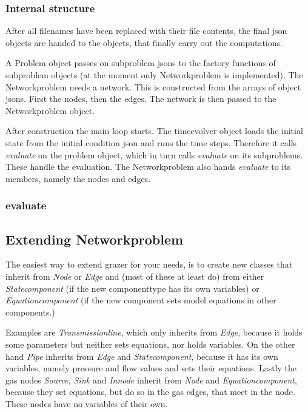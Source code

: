\documentclass[a4paper]{article}
\begin{document}
\subsubsection{Internal structure}
\label{sec:internal-structure}
After all filenames have been replaced with their file contents, the final json objects are handed to the objects, that finally carry out the computations.

A Problem object passes on subproblem jsons to the factory functions of subproblem objects (at the moment only Networkproblem is implemented).
The Networkproblem needs a network.
This is constructed from the arrays of object jsons. First the nodes, then the edges. The network is then passed to the Networkproblem object.


After construction the main loop starts.
The timeevolver object loads the initial state from the initial condition json and runs the time steps.
Therefore it calls \emph{evaluate} on the problem object, which in turn calls \emph{evaluate} on its subproblems.
These handle the evaluation. The Networkproblem also hands \emph{evaluate} to its members, namely the nodes and edges.

\subsubsection*{evaluate}

\subsection{Extending Networkproblem}
\label{sec:extend-netw}
The easiest way to extend grazer for your needs, is to create new classes that inherit from \emph{Node} or \emph{Edge} and
(most of these at least do) from either \emph{Statecomponent} (if the new componenttype has its own variables) or
\emph{Equationcomponent} (if the new component sets model equations in other components.)

Examples are \emph{Transmissionline}, which only inherits from \emph{Edge}, because it holds some parameters but neither sets equations, nor holds variables.
On the other hand \emph{Pipe} inherits from \emph{Edge} and \emph{Statecomponent}, because it has its own variables, namely pressure and flow values and sets their equations.
Lastly the gas nodes \emph{Source, Sink} and \emph{Innode} inherit from \emph{Node} and \emph{Equationcomponent}, because they set equations, but do so in the gas edges, that meet in the node. These nodes have no variables of their own.
\end{document}
